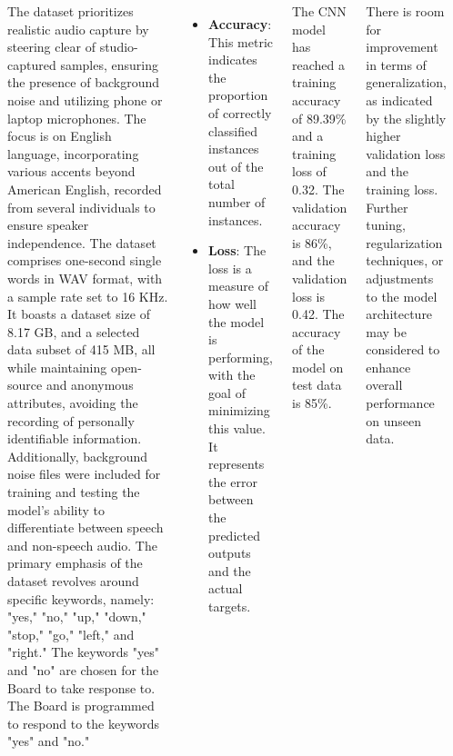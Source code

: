 \documentclass[25pt,a0paper, portrait]{tikzposter}
\begin{document}
\begin{columns}
{		}
		
		
		{
			{
				The dataset prioritizes realistic audio capture by steering clear of studio-captured samples, ensuring the presence of background noise and utilizing phone or laptop microphones. The focus is on English language, incorporating various accents beyond American English, recorded from several individuals to ensure speaker independence. The dataset comprises one-second single words in WAV format, with a sample rate set to 16 KHz. It boasts a dataset size of 8.17 GB, and a selected data subset of 415 MB, all while maintaining open-source and anonymous attributes, avoiding the recording of personally identifiable information. Additionally, background noise files were included for training and testing the model's ability to differentiate between speech and non-speech audio. The primary emphasis of the dataset revolves around specific keywords, namely: "yes," "no," "up," "down," "stop," "go," "left," and "right." The keywords "yes" and "no" are chosen for the Board to take response to. The Board is programmed to respond to the keywords "yes" and "no."
			}

		}
		
		{
			\begin{itemize}
				\item \textbf{Accuracy}: This metric indicates the proportion of correctly classified instances out of the total number of instances. 
				
				\item \textbf{Loss}: The loss is a measure of how well the model is performing, with the goal of minimizing this value. It represents the error between the predicted outputs and the actual targets. 
			\end{itemize}
		}
		
		{			
			The CNN model has reached a training accuracy of 89.39\% and a training loss of 0.32. The validation accuracy is 86\%, and the validation loss is 0.42. The accuracy of the model on test data is 85\%.
			
			There is room for improvement in terms of generalization, as indicated by the slightly higher validation loss and the training loss. Further tuning, regularization techniques, or adjustments to the model architecture may be considered to enhance overall performance on unseen data.
			
}
\end{columns}
\end{document}
